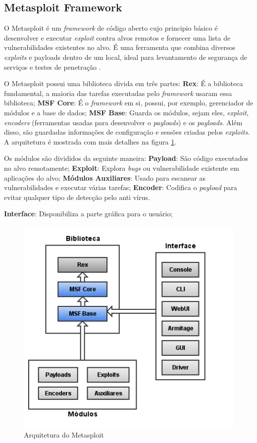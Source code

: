 \documentclass[
	12pt,				
	openright,		
	twoside,	
	a4paper,
	english,	
	brazil	
	]{abntex2}
\begin{document}
\subsection{Metasploit Framework} \label{sec:metasploit}

O Metasploit é um \textit{framework} de código aberto cujo principio básico é desenvolver e executar \textit{exploit} contra alvos remotos e fornecer uma lista de vulnerabilidades existentes no alvo. É uma ferramenta que combina diversos \textit{exploits} e payloads dentro de um local, ideal para levantamento de segurança de serviços e testes de penetração \cite{metasploit:yash}.  

O Metasploit possui uma biblioteca divida em três partes: \textbf{Rex}: É a biblioteca fundamental, a maioria das tarefas executadas pelo \textit{framework} usaram essa biblioteca; \textbf{MSF Core}: É o \textit{framework} em si, possui, por exemplo, gerenciador de módulos e a base de dados; \textbf{MSF Base}: Guarda os módulos, sejam eles, \textit{exploit}, \textit{encoders} (ferramentas usadas para desenvolver o \textit{payloads}) e os \textit{payloads}. Além disso, são guardadas informações de configuração e sessões criadas pelos \textit{exploits}. A arquitetura é mostrada com mais detalhes na figura \ref{fig:arqmetasploit}. 

Os módulos são divididos da seguinte maneira: \textbf{Payload}: São código executados no alvo remotamente; \textbf{Exploit}: Explora \textit{bugs} ou vulnerabilidade existente em aplicações do alvo; \textbf{Módulos Auxiliares}: Usado para escanear as vulnerabilidades e executar várias tarefas; \textbf{Encoder}: Codifica o \textit{payload} para evitar qualquer tipo de detecção pelo anti vírus.

\textbf{Interface}: Disponibiliza a parte gráfica para o usuário;

\begin{figure}[!htp]
 \centering
 \includegraphics[scale=.6]{metasploit_arquitetura.png}
 \caption{Arquitetura do Metasploit}
 \label{fig:arqmetasploit}
\end{figure}
\end{document}

